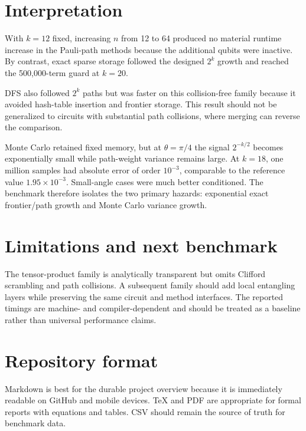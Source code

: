 \documentclass[10pt]{article}
\begin{document}
\section{Interpretation}
With $k=12$ fixed, increasing $n$ from 12 to 64 produced no material runtime increase in the Pauli-path methods because the additional qubits were inactive. By contrast, exact sparse storage followed the designed $2^k$ growth and reached the 500,000-term guard at $k=20$.

DFS also followed $2^k$ paths but was faster on this collision-free family because it avoided hash-table insertion and frontier storage. This result should not be generalized to circuits with substantial path collisions, where merging can reverse the comparison.

Monte Carlo retained fixed memory, but at $\theta=\pi/4$ the signal $2^{-k/2}$ becomes exponentially small while path-weight variance remains large. At $k=18$, one million samples had absolute error of order $10^{-3}$, comparable to the reference value $1.95\times10^{-3}$. Small-angle cases were much better conditioned. The benchmark therefore isolates the two primary hazards: exponential exact frontier/path growth and Monte Carlo variance growth.
\section{Limitations and next benchmark}
The tensor-product family is analytically transparent but omits Clifford scrambling and path collisions. A subsequent family should add local entangling layers while preserving the same circuit and method interfaces. The reported timings are machine- and compiler-dependent and should be treated as a baseline rather than universal performance claims.
\section{Repository format}
Markdown is best for the durable project overview because it is immediately readable on GitHub and mobile devices. TeX and PDF are appropriate for formal reports with equations and tables. CSV should remain the source of truth for benchmark data.
\end{document}
